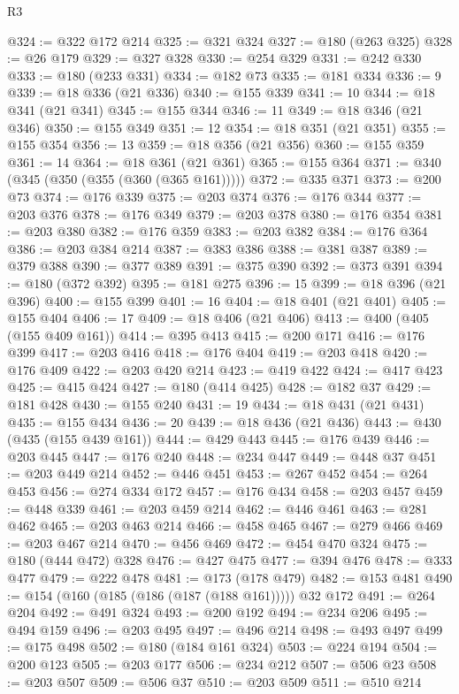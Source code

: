 \begin{lexlean}{R3}
\begin{coremodule}
@324 := @322 @172 @214
@325 := @321 @324
@327 := @180 (@263 @325)
@328 := @26 @179
@329 := @327 @328
@330 := @254 @329
@331 := @242 @330
@333 := @180 (@233 @331)
@334 := @182 @73
@335 := @181 @334
@336 := 9
@339 := @18 @336 (@21 @336)
@340 := @155 @339
@341 := 10
@344 := @18 @341 (@21 @341)
@345 := @155 @344
@346 := 11
@349 := @18 @346 (@21 @346)
@350 := @155 @349
@351 := 12
@354 := @18 @351 (@21 @351)
@355 := @155 @354
@356 := 13
@359 := @18 @356 (@21 @356)
@360 := @155 @359
@361 := 14
@364 := @18 @361 (@21 @361)
@365 := @155 @364
@371 := @340 (@345 (@350 (@355 (@360 (@365 @161)))))
@372 := @335 @371
@373 := @200 @73
@374 := @176 @339
@375 := @203 @374
@376 := @176 @344
@377 := @203 @376
@378 := @176 @349
@379 := @203 @378
@380 := @176 @354
@381 := @203 @380
@382 := @176 @359
@383 := @203 @382
@384 := @176 @364
@386 := @203 @384 @214
@387 := @383 @386
@388 := @381 @387
@389 := @379 @388
@390 := @377 @389
@391 := @375 @390
@392 := @373 @391
@394 := @180 (@372 @392)
@395 := @181 @275
@396 := 15
@399 := @18 @396 (@21 @396)
@400 := @155 @399
@401 := 16
@404 := @18 @401 (@21 @401)
@405 := @155 @404
@406 := 17
@409 := @18 @406 (@21 @406)
@413 := @400 (@405 (@155 @409 @161))
@414 := @395 @413
@415 := @200 @171
@416 := @176 @399
@417 := @203 @416
@418 := @176 @404
@419 := @203 @418
@420 := @176 @409
@422 := @203 @420 @214
@423 := @419 @422
@424 := @417 @423
@425 := @415 @424
@427 := @180 (@414 @425)
@428 := @182 @37
@429 := @181 @428
@430 := @155 @240
@431 := 19
@434 := @18 @431 (@21 @431)
@435 := @155 @434
@436 := 20
@439 := @18 @436 (@21 @436)
@443 := @430 (@435 (@155 @439 @161))
@444 := @429 @443
@445 := @176 @439
@446 := @203 @445
@447 := @176 @240
@448 := @234 @447
@449 := @448 @37
@451 := @203 @449 @214
@452 := @446 @451
@453 := @267 @452
@454 := @264 @453
@456 := @274 @334 @172
@457 := @176 @434
@458 := @203 @457
@459 := @448 @339
@461 := @203 @459 @214
@462 := @446 @461
@463 := @281 @462
@465 := @203 @463 @214
@466 := @458 @465
@467 := @279 @466
@469 := @203 @467 @214
@470 := @456 @469
@472 := @454 @470 @324
@475 := @180 (@444 @472) @328
@476 := @427 @475
@477 := @394 @476
@478 := @333 @477
@479 := @222 @478
@481 := @173 (@178 @479)
@482 := @153 @481
@490 := @154 (@160 (@185 (@186 (@187 (@188 @161))))) @32 @172
@491 := @264 @204
@492 := @491 @324
@493 := @200 @192
@494 := @234 @206
@495 := @494 @159
@496 := @203 @495
@497 := @496 @214
@498 := @493 @497
@499 := @175 @498
@502 := @180 (@184 @161 @324)
@503 := @224 @194
@504 := @200 @123
@505 := @203 @177
@506 := @234 @212
@507 := @506 @23
@508 := @203 @507
@509 := @506 @37
@510 := @203 @509
@511 := @510 @214

\end{coremodule}
\end{lexlean}
